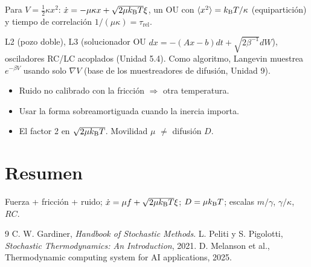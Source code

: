 \documentclass[11pt,a4paper]{article}
\begin{document}
\begin{ejemplo}
Para $V=\frac12\kappa x^2$: $\dot x=-\mu\kappa x+\sqrt{2\mu k_{\mathrm B} T}\xi$, un OU con $\langle x^2\rangle=k_{\mathrm B} T/\kappa$ (equipartición) y
tiempo de correlación $1/(\mu\kappa)=\tau_{\text{rel}}$.
\end{ejemplo}

\begin{aplicacion}
L2 (pozo doble), L3 (solucionador OU $dx=-(Ax-b)dt+\sqrt{2\beta^{-1}}dW$), osciladores RC/LC acoplados (Unidad 5.4). Como
algoritmo, Langevin muestrea $e^{-\beta V}$ usando solo $\nabla V$ (base de los muestreadores de difusión, Unidad 9).
\end{aplicacion}

\begin{error}
\begin{itemize}[nosep]
\item Ruido no calibrado con la fricción $\Rightarrow$ otra temperatura.
\item Usar la forma sobreamortiguada cuando la inercia importa.
\item El factor 2 en $\sqrt{2\mu k_{\mathrm B} T}$. \quad Movilidad $\mu$ $\neq$ difusión $D$.
\end{itemize}
\end{error}

\section{Resumen}
Fuerza + fricción + ruido; $\dot x=\mu f+\sqrt{2\mu k_{\mathrm B} T}\xi$; $D=\mu k_{\mathrm B} T$; escalas $m/\gamma$, $\gamma/\kappa$, $RC$.

\begin{thebibliography}{9}\small
{} C. W. Gardiner, \emph{Handbook of Stochastic Methods}.
 L. Peliti y S. Pigolotti, \emph{Stochastic Thermodynamics: An Introduction}, 2021.
 D. Melanson et al., Thermodynamic computing system for AI applications, 2025.
\end{thebibliography}
\end{document}
